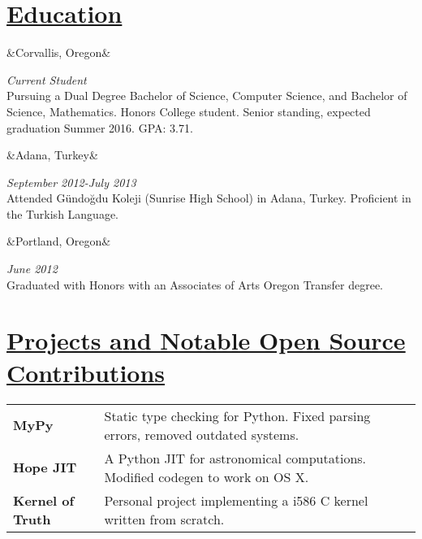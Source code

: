 \documentclass[11pt]{article}
\newcommand{\heading}[1]{
    \section*{\uline{#1 \hfill}}
}
\newcommand{\squish}{
    \setlength{\itemsep}{0.5pt}
    \setlength{\parskip}{0pt}
    \setlength{\parsep}{0.5pt}
}
\newcommand{\when}[1]{
    \hfill \emph{#1}
}
\newcommand{\experience}[3]{
    \ifx&#2&
        \item[{#1}]
    \else
        \item[{#1}, \emph{#2}]
    \fi
    \when{#3}\\
}
\begin{document}
\heading{Education}
\squish
\begin{description}
\squish
	\experience{Oregon State University}
	           {Corvallis, Oregon}
			   {Current Student}
		Pursuing a Dual Degree Bachelor of Science, Computer Science,
		and Bachelor of Science, Mathematics.
		Honors College student. Senior standing, expected graduation Summer
		2016. GPA: 3.71.

	\experience{AFS Turkey Foreign Exchange Program}
               {Adana, Turkey}
			   {September 2012-July 2013}
		Attended G{\" u}ndo{\u g}du Koleji (Sunrise High School) in Adana,
		Turkey. Proficient in the Turkish Language.

	\experience{Portland Community College}
	           {Portland, Oregon}
			   {June 2012}
		Graduated with Honors with an Associates of Arts
		Oregon Transfer degree.
\end{description}

\heading{Projects and Notable Open Source Contributions}
\begin{tabular}{ p{3cm} p{12cm}}
\textbf{MyPy} & Static type checking for Python. Fixed parsing errors,
	removed outdated systems. \\
\textbf{Hope JIT} & A Python JIT for astronomical computations. Modified codegen
to work on OS X. \\
\textbf{Kernel of Truth} & Personal project implementing a i586 C kernel written
	from scratch. \\
\end{tabular}
\end{document}
